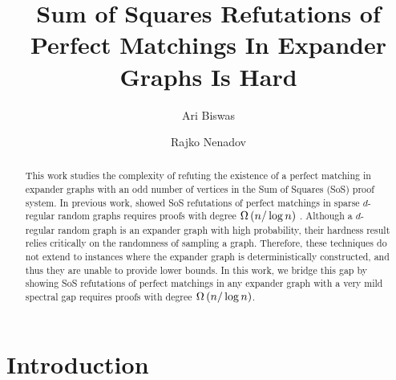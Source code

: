 \documentclass[11pt]{article}
\title{Sum of Squares Refutations of Perfect Matchings In Expander Graphs Is Hard}
\author[1]{Ari Biswas}
\author[2]{Rajko Nenadov}
\affil[1]{\small University Of Warwick, United Kingdom}
\affil[2]{\small University Of Auckland, New Zealand}
\date{}
\begin{document}
\maketitle
\begin{abstract}
This work studies the complexity of refuting the existence of a perfect matching in expander graphs with an odd number of vertices in the Sum of Squares (SoS) proof system.
In previous work, \citet{Austrin_2022} showed  SoS refutations of perfect matchings in sparse $d$-regular random graphs requires proofs with degree $\Omega\left(n/\log n\right)$ .
Although a $d$-regular random graph is an expander graph with high probability, their hardness result relies critically on the randomness of sampling a graph. 
Therefore, these techniques do not extend to instances where the expander graph is deterministically constructed, and thus they are unable to provide  lower bounds.
In this work, we bridge this gap by showing SoS refutations of perfect matchings in any expander graph with a very mild spectral gap requires proofs with degree $\Omega\left(n/\log n\right)$.

\end{abstract}

\section{Introduction}
\end{document}
